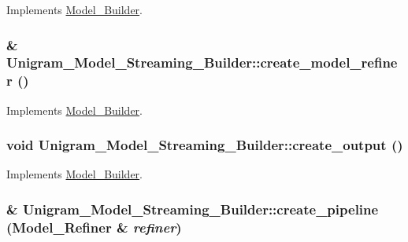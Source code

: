 Implements \hyperlink{class_model___builder_a52e9a4125b917b015f13c709ddef3a88}{Model\_\-Builder}.

\hypertarget{class_unigram___model___streaming___builder_a99deeb4b433573561f57df03c4d10bd2}{
\subsubsection[{create\_\-model\_\-refiner}]{ \& Unigram\_\-Model\_\-Streaming\_\-Builder::create\_\-model\_\-refiner ()}}
\label{class_unigram___model___streaming___builder_a99deeb4b433573561f57df03c4d10bd2}


Implements \hyperlink{class_model___builder_abc7e4f108067afb34fb8c0fc305b06ea}{Model\_\-Builder}.

\hypertarget{class_unigram___model___streaming___builder_a82ebccd666a5c8f46886323a323679e6}{
\subsubsection[{create\_\-output}]{\setlength{\rightskip}{0pt plus 5cm}void Unigram\_\-Model\_\-Streaming\_\-Builder::create\_\-output ()}}
\label{class_unigram___model___streaming___builder_a82ebccd666a5c8f46886323a323679e6}


Implements \hyperlink{class_model___builder_aab7de81c31d1a76e5427023b6cb95490}{Model\_\-Builder}.

\hypertarget{class_unigram___model___streaming___builder_af846cbebd1061196deaae3ec1ae7e7c2}{
\subsubsection[{create\_\-pipeline}]{ \& Unigram\_\-Model\_\-Streaming\_\-Builder::create\_\-pipeline ({\bf Model\_\-Refiner} \& {\em refiner})}}
\label{class_unigram___model___streaming___builder_af846cbebd1061196deaae3ec1ae7e7c2}



